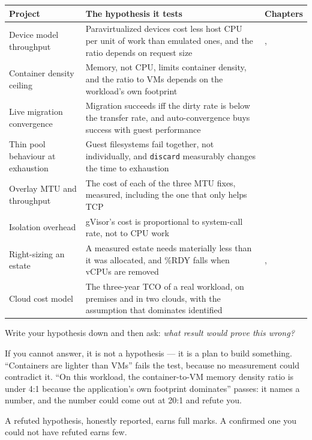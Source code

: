 \begin{longtable}{@{}L{4.4cm}L{5.4cm}L{4.5cm}@{}}
\toprule
{}
\textbf{Project} & \textbf{The hypothesis it tests} & \textbf{Chapters} \\
\midrule
\endhead
Device model throughput & Paravirtualized devices cost less host CPU per unit
of work than emulated ones, and the ratio depends on request size &
,  \\
Container density ceiling & Memory, not CPU, limits container density, and the
ratio to VMs depends on the workload's own footprint &  \\
Live migration convergence & Migration succeeds iff the dirty rate is below the
transfer rate, and auto-convergence buys success with guest performance &
 \\
Thin pool behaviour at exhaustion & Guest filesystems fail together, not
individually, and \texttt{discard} measurably changes the time to exhaustion &
 \\
Overlay MTU and throughput & The cost of each of the three MTU fixes, measured,
including the one that only helps TCP &  \\
Isolation overhead & gVisor's cost is proportional to system-call rate, not to
CPU work &  \\
Right-sizing an estate & A measured estate needs materially less than it was
allocated, and \%RDY falls when vCPUs are removed & ,
 \\
Cloud cost model & The three-year TCO of a real workload, on premises and in
two clouds, with the assumption that dominates identified &  \\
\bottomrule
\end{longtable}

\begin{conceptbox}
Write your hypothesis down and then ask: \emph{what result would prove this
wrong?}

\smallskip
If you cannot answer, it is not a hypothesis --- it is a plan to build
something. ``Containers are lighter than VMs'' fails the test, because no
measurement could contradict it. ``On this workload, the container-to-VM memory
density ratio is under 4:1 because the application's own footprint dominates''
passes: it names a number, and the number could come out at 20:1 and refute
you.

\smallskip
A refuted hypothesis, honestly reported, earns full marks. A confirmed one you
could not have refuted earns few.
\end{conceptbox}

